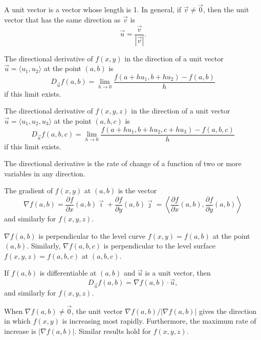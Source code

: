 \begin{definition}
	A unit vector is a vector whose length is 1. In general, if $\vec{v} \neq
	\vec{0}$, then the unit vector that has the same direction as $\vec{v}$ is
	\[
		\vec{u} = \frac{\vec{v}}{|\vec{v}|}.
	\]
\end{definition}

\begin{definition}
	The directional derivative of $f(x, y)$ in the direction of a unit vector
	$\vec{u} = \langle u_1, u_2 \rangle$ at the point $(a, b)$ is
	\[
		D_{\vec{u}} f(a, b) = \lim_{h \rightarrow 0} \frac{f(a + h u_1, b + h u_2) -
		f(a, b)}{h}
	\]
	if this limit exists.

	The directional derivative of $f(x, y, z)$ in the direction of a unit vector
	$\vec{u} = \langle u_1, u_2, u_3 \rangle$ at the point $(a, b, c)$ is
	\[
		D_{\vec{u}} f(a, b, c) = \lim_{h \rightarrow 0} \frac{f(a + h u_1, b + h
		u_2, c + h u_3) - f(a, b, c)}{h}
	\]
	if this limit exists.
\end{definition}

\begin{interpretation}
	The directional derivative is the rate of change of a function of two or more
	variables in any direction.
\end{interpretation}

\begin{definition}
	The gradient of $f(x, y)$ at $(a, b)$ is the vector
	\[
		\nabla f(a, b) = \frac{\partial f}{\partial x}(a, b) \vec{\imath} +
		\frac{\partial f}{\partial y}(a, b) \vec{\jmath} = \left\langle
		\frac{\partial f}{\partial x}(a, b), \frac{\partial f}{\partial y}(a, b)
		\right\rangle
	\]
	and similarly for $f(x, y, z)$.
\end{definition}

\begin{fact}
	$\nabla f(a, b)$ is perpendicular to the level curve $f(x, y) = f(a, b)$ at
	the point $(a, b)$. Similarly, $\nabla f(a, b, c)$ is perpendicular to the
	level surface $f(x, y, z) = f(a, b, c)$ at $(a, b, c)$.
\end{fact}

\begin{theorem}
	If $f(a, b)$ is differentiable at $(a, b)$ and $\vec{u}$ is a unit vector,
	then
	\[
		D_{\vec{u}} f(a, b) = \nabla f(a, b) \cdot \vec{u},
	\]
	and similarly for $f(x, y, z)$.
\end{theorem}

\begin{theorem}
	When $\nabla f(a, b) \neq \vec{0}$, the unit vector $\nabla f(a, b) / |\nabla
	f(a, b)|$ gives the direction in which $f(x, y)$ is increasing most rapidly.
	Furthermore, the maximum rate of increase is $|\nabla f(a, b)|$. Similar
	results hold for $f(x, y, z)$.
\end{theorem}
